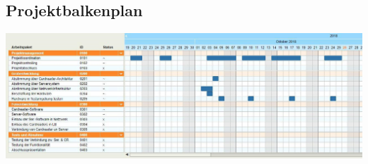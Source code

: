 \newpage


\subsection{Projektbalkenplan}

\begin{center}
    \includegraphics[angle=-90,scale=0.58]{images/balkenplan.png}
\end{center}
\vspace{1cm}
\newpage 

